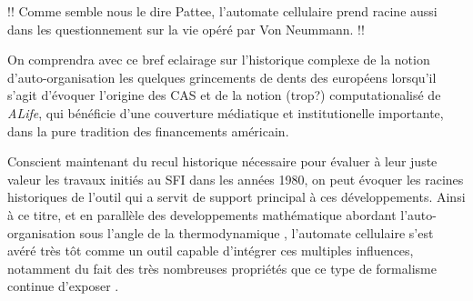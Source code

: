 

!! Comme semble nous le dire Pattee, l'automate cellulaire prend racine aussi dans les questionnement sur la vie opéré par Von Neummann. !!

On comprendra avec ce bref eclairage sur l'historique complexe de la notion d'auto-organisation les quelques grincements de dents des européens \autocite{Varela1995} lorsqu'il s'agit d'évoquer l'origine des CAS et de la notion (trop?) computationalisé de \textit{ALife}, qui bénéficie d'une couverture médiatique et institutionelle importante, dans la pure tradition des financements américain.  



Conscient maintenant du recul historique nécessaire pour évaluer à leur juste valeur les travaux initiés au SFI dans les années 1980, on peut évoquer les racines historiques de l'outil qui a servit de support principal à ces développements. Ainsi à ce titre, et en parallèle des developpements mathématique abordant l'auto-organisation sous l'angle de la thermodynamique , l'automate cellulaire s'est avéré très tôt comme un outil capable d'intégrer ces multiples influences, notamment du fait des très nombreuses propriétés que ce type de formalisme continue d'exposer \autocite{Ganguly2003}. %

